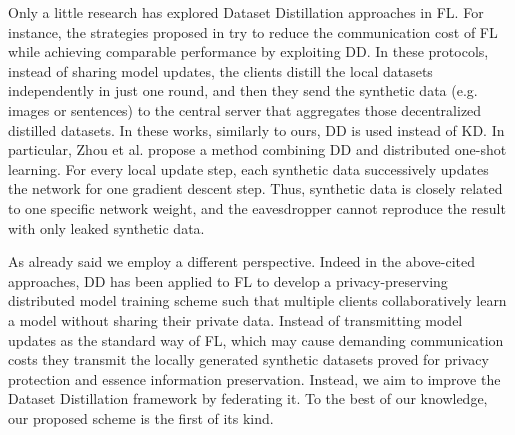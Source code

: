 Only a little research has explored Dataset Distillation approaches in FL. For instance, the strategies proposed in \cite{zhou2020distilled,song2023federated,cazenavette2022dataset} try to reduce the communication cost of FL while achieving comparable performance by exploiting DD. In these protocols, instead of sharing model updates, the clients distill
the local datasets independently in just one round, and then they send the synthetic data (e.g. images or sentences) to the central server that aggregates those decentralized distilled datasets. In these works, similarly to ours, DD is used instead of KD. In particular, Zhou et al. \cite{zhou2020distilled} propose a method combining DD and distributed one-shot learning. For every local update step, each synthetic data successively updates the network for one gradient descent step. Thus, synthetic data is closely related to one specific network weight, and the eavesdropper cannot reproduce the result with only leaked synthetic data.

As already said we employ a different perspective. Indeed in the above-cited approaches, DD has been applied to FL to develop a
privacy-preserving distributed model training scheme such that
multiple clients collaboratively learn a model without sharing
their private data. Instead of transmitting model updates as the standard way of FL, which may cause demanding communication costs they transmit the locally generated synthetic datasets proved for
privacy protection and essence information preservation. Instead, we aim to improve the Dataset Distillation framework by federating it.
To the best of our knowledge, our proposed scheme is the first of its kind.